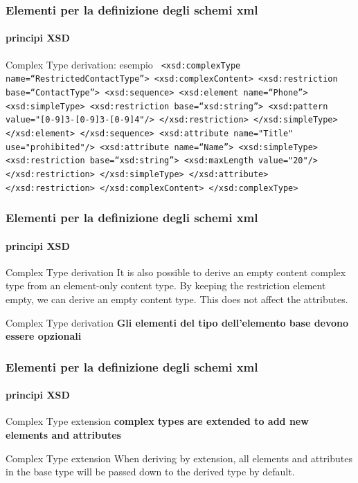 \begin{frame}
	\frametitle{Elementi per la definizione degli schemi xml}
	\framesubtitle{principi XSD}
	\addtocounter{nframe}{1}

	\begin{block}{Complex Type derivation: esempio}
		\texttt{   <xsd:complexType name=``RestrictedContactType''>
		<xsd:complexContent>
		<xsd:restriction base=``ContactType''>
		<xsd:sequence>
		<xsd:element name=``Phone''>
		<xsd:simpleType>
		<xsd:restriction base=``xsd:string''>
		<xsd:pattern value="[0-9]{3}-[0-9]{3}-[0-9]{4}"/>
		</xsd:restriction>
		</xsd:simpleType>
		</xsd:element>
		</xsd:sequence>
		<xsd:attribute name="Title" use="prohibited"/>
		<xsd:attribute name=``Name''>
		<xsd:simpleType>
		<xsd:restriction base=``xsd:string''>
		<xsd:maxLength value="20"/>
		</xsd:restriction>
		</xsd:simpleType>
		</xsd:attribute>
		</xsd:restriction>
		</xsd:complexContent>
		</xsd:complexType>}
	\end{block}
\end{frame}


\begin{frame}
	\frametitle{Elementi per la definizione degli schemi xml}
	\framesubtitle{principi XSD}
	\addtocounter{nframe}{1}

	\begin{block}{Complex Type derivation}
		It is also possible to derive an empty content complex type from an element-only content type. By keeping the restriction element empty, we can derive an empty content type. This does not affect the attributes.
	\end{block}

	\begin{block}{Complex Type derivation}
		\textbf{Gli elementi del tipo dell'elemento base devono essere opzionali}
	\end{block}
\end{frame}


\begin{frame}
	\frametitle{Elementi per la definizione degli schemi xml}
	\framesubtitle{principi XSD}
	\addtocounter{nframe}{1}

	\begin{block}{Complex Type extension}
		\textbf{complex types are extended to add new elements and attributes}
	\end{block}

	\begin{block}{Complex Type extension}
		When deriving by extension, all elements and attributes in the base type will be passed down to the derived type by default.
	\end{block}
\end{frame}


